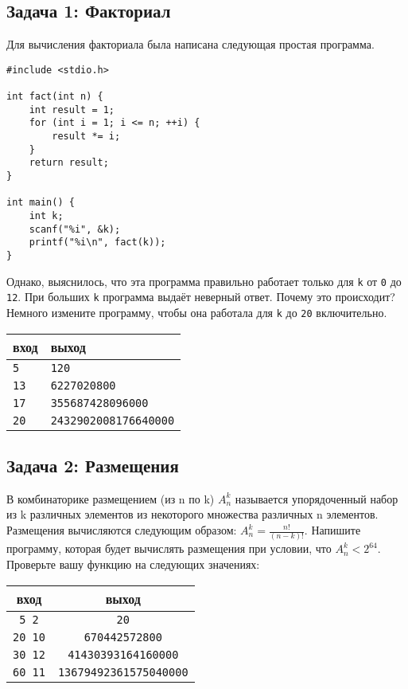\documentclass{article}
\begin{document}
\subsection*{Задача 1: Факториал}
Для вычисления факториала была написана следующая простая программа. 
\begin{lstlisting}
#include <stdio.h>

int fact(int n) {
    int result = 1;
    for (int i = 1; i <= n; ++i) {
        result *= i;
    }
    return result;
}

int main() {
    int k;
    scanf("%i", &k);
    printf("%i\n", fact(k));
}
\end{lstlisting}
Однако, выяснилось, что эта программа правильно работает только для \texttt{k} от \texttt{0} до \texttt{12}. При больших \texttt{k} программа выдаёт неверный ответ. Почему это происходит?
Немного измените программу, чтобы она работала для \texttt{k} до \texttt{20} включительно.

\begin{center}
\begin{tabular}{ l l }
 вход & выход \\ \hline
 \texttt{5} & \texttt{120}  \\ 
 \texttt{13} & \texttt{6227020800} \\
 \texttt{17} & \texttt{355687428096000} \\
 \texttt{20} & \texttt{2432902008176640000} \\
\end{tabular}
\end{center}


\subsection*{Задача 2: Размещения}
В комбинаторике размещением (из n по k) $A_n^k$ называется упорядоченный набор из k различных элементов из некоторого множества различных n элементов. Размещения вычисляются следующим образом: $A_n^k = \frac{n!}{(n-k)!}$. Напишите программу, которая будет вычислять размещения при условии, что  $A_n^k < 2^{64}$. Проверьте вашу функцию на следующих значениях:
\begin{center}
\begin{tabular}{ c c }
 вход & выход \\ \hline
 \texttt{5 2} & \texttt{20}  \\ 
 \texttt{20 10} & \texttt{670442572800}  \\ 
 \texttt{30 12} & \texttt{41430393164160000} \\ 
 \texttt{60 11} & \texttt{13679492361575040000} \\   
\end{tabular}
\end{center}
\end{document}
